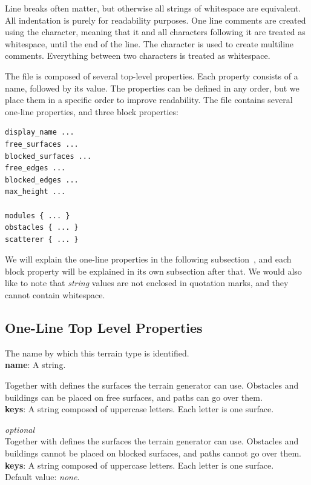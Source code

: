Line breaks often matter, but otherwise all strings of whitespace are equivalent.
All indentation is purely for readability purposes.
One line comments are created using the \mono{\#} character, meaning that it and all characters following it are treated as whitespace, until the end of the line.
The \mono{\%} character is used to create multiline comments.
Everything between two \mono{\%} characters is treated as whitespace.

The file is composed of several top-level properties.
Each property consists of a name, followed by its value.
The properties can be defined in any order, but we place them in a specific order to improve readability.
The file contains several one-line properties, and three block properties:
\begin{verbatim}
display_name ...
free_surfaces ...
blocked_surfaces ...
free_edges ...
blocked_edges ...
max_height ...

modules { ... }
obstacles { ... }
scatterer { ... }
\end{verbatim}

We will explain the one-line properties in the following subsection~, and each block property will be explained in its own subsection after that.
We would also like to note that \emph{string} values are not enclosed in quotation marks, and they cannot contain whitespace.

\subsection{One-Line Top Level Properties}

The name by which this terrain type is identified.\\
\textbf{name}: A string.

Together with  defines the surfaces the terrain generator can use.
Obstacles and buildings can be placed on free surfaces, and paths can go over them.\\
\textbf{keys}: A string composed of uppercase letters. Each letter is one surface.

\emph{optional}\\
Together with  defines the surfaces the terrain generator can use.
Obstacles and buildings cannot be placed on blocked surfaces, and paths cannot go over them.\\
\textbf{keys}: A string composed of uppercase letters. Each letter is one surface.\\
Default value: \emph{none}.

